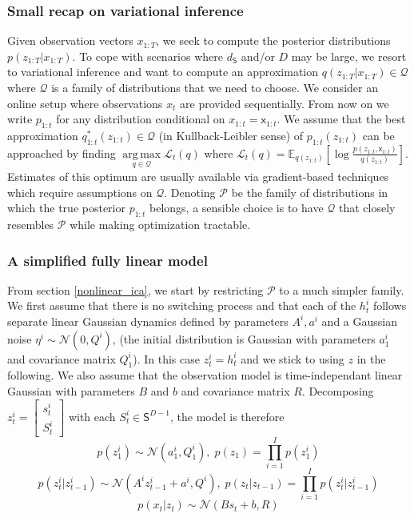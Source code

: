 \documentclass{article}
\newcommand{\1}{\mathbbm{1}}
\newcommand{\eqsp}{\;}
\newcommand{\expect}[2]{\mathbb{E}_{#1}\left[#2\right]}
\newcommand{\gaussian}[2]{\mathcal{N}\left( #1, #2 \right)}
\DeclareMathOperator*{\argmax}{arg\,max}
\begin{document}
\subsubsection*{Small recap on variational inference}
Given observation vectors $x_{1:T}$, we seek to compute the posterior distributions $p( z_{1:T}|x_{1:T})$. To cope with scenarios where $d_{\mathsf{S}}$ and/or $D$ may be large, we resort to variational inference and want to compute an approximation $q( z_{1:T}|x_{1:T}) \in \mathcal{Q}$ where $\mathcal{Q}$ is a family of distributions that we need to choose. 
We consider an online setup where observations $x_t$ are provided sequentially. From now on we write $p_{1:t}$ for any distribution conditional on $x_{1:t} = \mathsf{x}_{1:t}$. We assume that the best approximation $q_{1:t}^*(z_{1:t}) \in \mathcal{Q}$ (in Kullback-Leibler sense) of $p_{1:t}( z_{1:t})$ can be approached by finding $\argmax\limits_{q \in \mathcal{Q}} \mathcal{L}_t(q)$ where $\mathcal{L}_t(q) = \expect{q(z_{1:t})}{\log\frac{p(z_{1:t}, \mathsf{x}_{1:t})}{q(z_{1:t})}}$. 
Estimates of this optimum are usually available via gradient-based techniques which require assumptions on $\mathcal{Q}$. 
Denoting $\mathcal{P}$ be the family of distributions in which the true posterior $p_{1:t}$ belongs, a sensible choice is to have $\mathcal{Q}$ that closely resembles $\mathcal{P}$ while making optimization tractable. 
\subsubsection*{A simplified fully linear model}
From section \ref{nonlinear_ica}, we start by restricting $\mathcal{P}$ to a much simpler family. We first assume that there is no switching process and that each of the $h_t^i$ follows separate linear Gaussian dynamics defined by parameters $A^i,a^i$ and a Gaussian noise $\eta^i \sim \gaussian{0}{Q^i}$, (the initial distribution is Gaussian with parameters $a_1^i$ and covariance matrix $Q_1^i$). In this case $z_t^i = h_t^i$ and we stick to using $z$ in the following. We also assume that the observation model is time-independant linear Gaussian with parameters $B$ and $b$ and covariance matrix $R$.
Decomposing $z_t^i = \begin{bmatrix}
    s_t^i \\
    S_t^i
    \end{bmatrix}$ 
with each $S_t^i \in \mathsf{S}^{D-1}$, the model is therefore
$$p(z_1^i) \sim \gaussian{a_1^i}{Q_1^i}, \eqsp p(z_1) = \prod_{i=1}^I p(z_1^i)$$
$$p(z_t^i|z_{t-1}^i) \sim \gaussian{A^i z_{t-1}^i + a^i}{Q^i}, \eqsp p(z_t|z_{t-1}) = \prod_{i=1}^I p(z_t^i|z_{t-1}^i)$$
$$p(x_t|z_t) \sim \gaussian{B s_t + b}{R}$$
\end{document}
